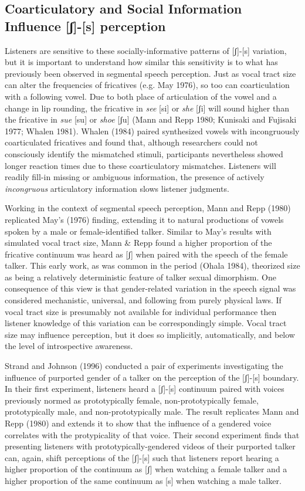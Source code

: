 \documentclass[
  letterpaper,
  DIV=11,
  numbers=noendperiod]{scrartcl}
\begin{document}
\subsection{Coarticulatory and Social Information Influence
{[}ʃ{]}-{[}s{]} perception}\label{sec-coart-soc}

Listeners are sensitive to these socially-informative patterns of
{[}ʃ{]}-{[}s{]} variation, but it is important to understand how similar
this sensitivity is to what has previously been observed in segmental
speech perception. Just as vocal tract size can alter the frequencies of
fricatives (e.g. May 1976), so too can coarticulation with a following
vowel. Due to both place of articulation of the vowel and a change in
lip rounding, the fricative in \emph{see} {[}si{]} or \emph{she}
{[}ʃi{]} will sound higher than the fricative in \emph{sue} {[}su{]} or
\emph{shoe} {[}ʃu{]} (Mann and Repp 1980; Kunisaki and Fujisaki 1977;
Whalen 1981). Whalen (1984) paired synthesized vowels with incongruously
coarticulated fricatives and found that, although researchers could not
consciously identify the mismatched stimuli, participants nevertheless
showed longer reaction times due to these coarticulatory mismatches.
Listeners will readily fill-in missing or ambiguous information, the
presence of actively \emph{incongruous} articulatory information slows
listener judgments.

Working in the context of segmental speech perception, Mann and Repp
(1980) replicated May's (1976) finding, extending it to natural
productions of vowels spoken by a male or female-identified talker.
Similar to May's results with simulated vocal tract size, Mann \& Repp
found a higher proportion of the fricative continuum was heard as
{[}ʃ{]} when paired with the speech of the female talker. This early
work, as was common in the period (Ohala 1984), theorized size as being
a relatively deterministic feature of talker sexual dimorphism. One
consequence of this view is that gender-related variation in the speech
signal was considered mechanistic, universal, and following from purely
physical laws. If vocal tract size is presumably not available for
individual performance then listener knowledge of this variation can be
correspondingly simple. Vocal tract size may influence perception, but
it does so implicitly, automatically, and below the level of
introspective awareness.

Strand and Johnson (1996) conducted a pair of experiments investigating
the influence of purported gender of a talker on the perception of the
{[}ʃ{]}-{[}s{]} boundary. In their first experiment, listeners heard a
{[}ʃ{]}-{[}s{]} continuum paired with voices previously normed as
prototypically female, non-prototypically female, prototypically male,
and non-prototypically male. The result replicates Mann and Repp (1980)
and extends it to show that the influence of a gendered voice correlates
with the protypicality of that voice. Their second experiment finds that
presenting listeners with prototypically-gendered videos of their
purported talker can, again, shift perceptions of the {[}ʃ{]}-{[}s{]}
such that listeners report hearing a higher proportion of the continuum
as {[}ʃ{]} when watching a female talker and a higher proportion of the
same continuum as {[}s{]} when watching a male talker.
\end{document}
